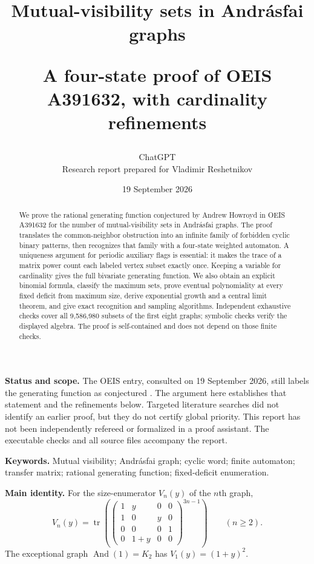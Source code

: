\documentclass[11pt,a4paper]{article}
\title{\vspace{-1.3cm}\color{ink}\bfseries Mutual-visibility sets in Andr\'asfai graphs\par
\large A four-state proof of OEIS A391632, with cardinality refinements}
\author{ChatGPT\\\small Research report prepared for Vladimir Reshetnikov}
\date{19 September 2026}
\theoremstyle{definition}
\newcommand{\tr}{\operatorname{tr}}
\newcommand{\Andr}{\operatorname{And}}
\begin{document}
\maketitle
\thispagestyle{empty}
\begin{abstract}
We prove the rational generating function conjectured by Andrew Howroyd in
OEIS A391632 for the number of mutual-visibility sets in Andr\'asfai graphs.
The proof translates the common-neighbor obstruction into an infinite family
of forbidden cyclic binary patterns, then recognizes that family with a
four-state weighted automaton. A uniqueness argument for periodic auxiliary
flags is essential: it makes the trace of a matrix power count each labeled
vertex subset exactly once. Keeping a variable for cardinality gives the full
bivariate generating function. We also obtain an explicit binomial formula,
classify the maximum sets, prove eventual polynomiality at every fixed deficit
from maximum size, derive exponential growth and a central limit theorem,
and give exact recognition and sampling algorithms. Independent exhaustive
checks cover all 9,586,980 subsets of the first eight graphs; symbolic checks
verify the displayed algebra. The proof is self-contained and does not depend
on those finite checks.
\end{abstract}

\noindent\textbf{Status and scope.}
The OEIS entry, consulted on 19 September 2026, still labels the generating
function as conjectured \cite{oeis}. The argument here establishes that
statement and the refinements below. Targeted literature searches did not
identify an earlier proof, but they do not certify global priority. This
report has not been independently refereed or formalized in a proof
assistant. The executable checks and all source files accompany the report.

\vspace{6pt}
\noindent\textbf{Keywords.}
Mutual visibility; Andr\'asfai graph; cyclic word; finite automaton;
transfer matrix; rational generating function; fixed-deficit enumeration.

\vspace{10pt}
\noindent\textbf{Main identity.}
For the size-enumerator $V_n(y)$ of the $n$th graph,
\[
 V_n(y)=\tr\!\left(
 \begin{pmatrix}
 1&y&0&0\\1&0&y&0\\0&0&0&1\\0&1+y&0&0
 \end{pmatrix}^{\!3n-1}\right)\qquad(n\ge2).
\]
The exceptional graph $\Andr(1)=K_2$ has $V_1(y)=(1+y)^2$.
\end{document}
